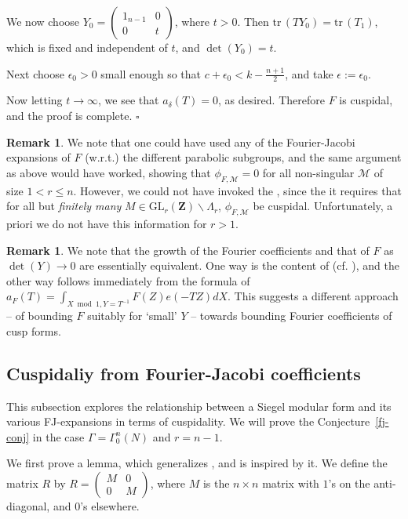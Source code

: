 \documentclass[12pt]{amsart}
\numberwithin{equation}{section}
\theoremstyle{plain}
\theoremstyle{definition}
\newtheorem{rmk}[thm]{Remark}
\newcommand{\mf}{\mathbf}
\newcommand{\mc}{\mathcal}
\newcommand{\mrm}{\mathrm}
\newcommand{\glrz}{\mrm{GL}_r( \mf Z)}
\newcommand{\tr}{\mathrm{tr}\,}
\newcommand*{\QEDB}{\hfill\ensuremath{\square}}
\newcommand{\psmb}{\left( \begin{smallmatrix}}
\newcommand{\psme}{ \end{smallmatrix} \right) }
\begin{document}
We now choose $Y_0 = \psmb 1_{n-1} & 0 \\ 0 & t \psme$, where $t>0$. Then $\tr (T Y_0)= \tr(T_1)$, which is fixed and independent of $t$, and $\det(Y_0)=t$. 

Next choose $\epsilon_0>0$ small enough so that $c+\epsilon_0<k-\frac{n+1}{2}$, and take $\epsilon:=\epsilon_0$.

Now letting $t \to \infty$, we see that $a_{\delta}(T) =0$, as desired. Therefore $F$ is cuspidal, and the proof is complete.
\QEDB

\begin{rmk}
    We note that one could have used any of the Fourier-Jacobi expansions of $F$ (w.r.t.) the different parabolic subgroups, and the same argument as above would have worked, showing that $\phi_{F, \mc M}=0$ for all non-singular $\mc M$ of size $1 < r \le n$. However, we could not have invoked the \cite[Theorem 5.7]{bo-das1}, since the it requires that for all but \textit{finitely many} $M \in \glrz \backslash \Lambda_r$, $\phi_{F, \mc M}$ be cuspidal. Unfortunately, a priori we do not have this information for $r>1$.
\end{rmk}

\begin{rmk}
    We note that the growth of the Fourier coefficients and that of $F$ as $\det(Y) \to 0$ are essentially equivalent. One way is the content of \cite{bo-ko} (cf. \cite{miyake}), and the other way follows immediately from the formula of $\displaystyle a_F(T) = \int_{X \bmod 1, Y=T^{-1}} F(Z)e(-TZ)dX$. This suggests a different approach -- of bounding $F$ suitably for `small' $Y$ -- towards bounding Fourier coefficients of cusp forms.
\end{rmk}

\subsection{Cuspidaliy from Fourier-Jacobi coefficients} \label{fj-sec}
This subsection explores the relationship between a Siegel modular form and its various FJ-expansions in terms of cuspidality. We will prove the Conjecture~\ref{fj-conj} in the case $\Gamma= \Gamma^n_0(N)$ and $r=n-1$.

We first prove a lemma, which generalizes  \cite[Lemma~3.4]{Ibu-SK}, and is inspired by it. We define the matrix $R$ by $R= \psmb M & 0 \\ 0 & M \psme$, where $M $ is the $n \times n$ matrix with $1$'s on the anti-diagonal, and $0$'s elsewhere. 
\end{document}
